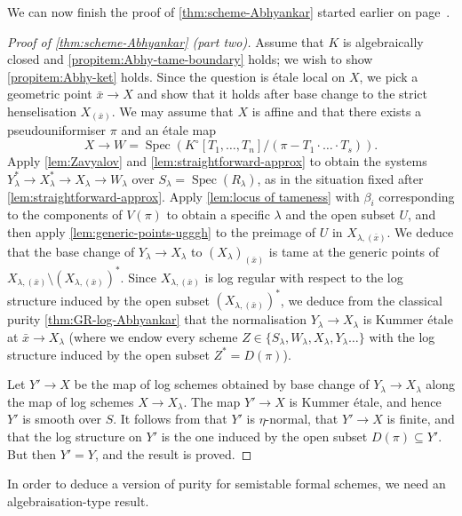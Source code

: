 \documentclass[a4paper,twoside,11pt,reqno]{amsart}
\newcommand{\la}{\longrightarrow}
\DeclareMathOperator{\Spec}{Spec}
\theoremstyle{definition}
\numberwithin{equation}{subsection}
\begin{document}
We can now finish the proof of \cref{thm:scheme-Abhyankar} started earlier on page~\pageref{proof:scheme-Abhyankar}.

\begin{proof}[Proof of \cref{thm:scheme-Abhyankar} (part two)]
Assume that $K$ is algebraically closed and \ref{propitem:Abhy-tame-boundary} holds; we wish to show \ref{propitem:Abhy-ket} holds. Since the question is \'etale local on $X$, we pick a geometric point $\bar x\to X$ and show that it holds after base change to the strict henselisation  $X_{(\bar x)}$. We may assume that $X$ is affine and that there exists a pseudouniformiser $\pi$ and an \'etale map 
\[
    X\la W=\Spec(K^\circ[T_1,\dots, T_n]/(\pi-T_1\cdot\ldots\cdot T_s)).
\]
Apply \cref{lem:Zavyalov} and \cref{lem:straightforward-approx} to obtain the systems $Y^*_\lambda\to X_\lambda^*\to X_\lambda\to W_\lambda$ over $S_\lambda=\Spec(R_\lambda)$, as in the situation fixed after \cref{lem:straightforward-approx}. Apply \cref{lem:locus of tameness} with $\beta_i$ corresponding to the components of $V(\pi)$ to obtain a specific $\lambda$ and the open subset $U$, and then apply \cref{lem:generic-points-ugggh} to the preimage of $U$ in $X_{\lambda,(\bar x)}$. We deduce that the base change of $Y_\lambda\to X_\lambda$ to $(X_\lambda)_{(\bar x)}$ is tame at the generic points of $X_{\lambda,(\bar x)} \setminus (X_{\lambda,(\bar x)})^*$. Since $X_{\lambda,(\bar x)}$ is log regular with respect to the log structure induced by the open subset $(X_{\lambda,(\bar x)})^*$, we deduce from the classical purity \cref{thm:GR-log-Abhyankar} that the normalisation $Y_\lambda\to X_\lambda$ is Kummer \'etale at $\bar x\to X_\lambda$ (where we endow every scheme $Z\in \{S_\lambda, W_\lambda, X_\lambda, Y_\lambda \dots\}$ with the log structure induced by the open subset $Z^* = D(\pi)$). 

Let $Y'\to X$ be the map of log schemes obtained by base change of $Y_\lambda\to X_\lambda$ along the map of log schemes $X\to X_\lambda$. The map $Y'\to X$ is Kummer \'etale, and hence $Y'$ is smooth over $S$. It follows from \cite[5.3.1, 5.3.4, and 5.3.7]{AHLS-Log} that $Y'$ is $\eta$-normal, that $Y'\to X$ is finite, and that the log structure on $Y'$ is the one induced by the open subset $D(\pi)\subseteq Y'$. But then $Y'=Y$, and the result is proved.
\end{proof}

In order to deduce a version of purity for semistable formal schemes, we need an algebraisation-type result. 
\end{document}
